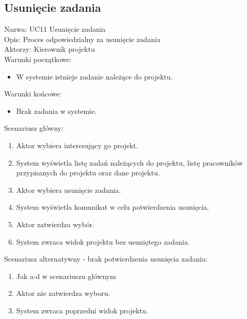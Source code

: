 \subsection{Usunięcie zadania}
\begin{adjustwidth}{5em}{0pt}
Nazwa: UC11 Usunięcie zadania\\
Opis: Proces odpowiedzialny za usunięcie zadania\\
Aktorzy: Kierownik projektu \\
Warunki początkowe:
\begin{itemize}
\item W systemie istnieje zadanie należące do projektu.
\end{itemize}
Warunki końcowe:
\begin{itemize}
\item Brak zadania w systemie.
\end{itemize}
Scenariusz główny:
\begin{enumerate}
\item Aktor wybiera interesujący go projekt.
\item System wyświetla listę zadań należących do projektu, listę pracowników przypisanych do projektu oraz dane projektu.
\item Aktor wybiera usunięcie zadania.
\item System wyświetla komunikat w celu potwierdzenia usunięcia.
\item Aktor zatwierdza wybór.
\item System zwraca widok projektu bez usuniętego zadania.
\end{enumerate}
Scenariusz alternatywny - brak potwierdzenia usunięcia zadania: 
\begin{enumerate}
\item Jak a-d w scenariuszu głównym
\item Aktor nie zatwierdza wyboru.
\item System zwraca poprzedni widok projektu.
\end{enumerate}
\end{adjustwidth}

